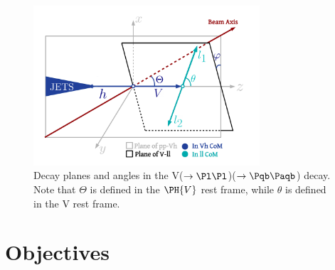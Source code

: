 \documentclass[a4paper,11pt]{article}
\newcommand{\Pb}{{{\Pqb}}\xspace}
\newcommand{\PAb}{{{{\Paqb}}}\xspace}
\renewcommand{\PV}{{{{V}}}\xspace}
\begin{document}
\begin{figure}[hbtp]
\begin{center}
\includegraphics[width=0.75\textwidth]{Figures/LHE/TheThreeAnglesVh.pdf}
\end{center}
\caption{
Decay planes and angles in the \PV($\to \Pl \Pl$)\PH($\to \Pb \PAb$) decay. Note that $\Theta$ is defined in the $\PH\PV$ rest frame, while $\theta$ is defined in the \PV rest frame.
}
\label{fig:HelicityFrame}
\end{figure}

\section{Objectives}
\label{sec:objective}
\end{document}
